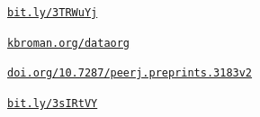 \documentclass[aspectratio=169,12pt,t]{beamer}
\begin{document}
\begin{frame}[c]{}

  \note{
  }
\end{frame}


\begin{frame}[c]{}
  \vspace{8pt}

  \centerline{}

  \vfill
  \hfill
  \href{https://bit.ly/3TRWuYj}{\tt \footnotesize \lolit bit.ly/3TRWuYj}

  \note{
  }
\end{frame}


\begin{frame}[c]{}
  \vspace{8pt}

  \centerline{}

  \vfill
  \hfill
  \href{https://kbroman.org/dataorg}{\tt \footnotesize \lolit kbroman.org/dataorg}

  \note{
  }
\end{frame}


\begin{frame}[c]{}
  \vspace{8pt}

  \centerline{}

  \vfill
  \hfill
  \href{https://doi.org/10.7287/peerj.preprints.3183v2}{\tt \footnotesize \lolit doi.org/10.7287/peerj.preprints.3183v2}

  \note{
  }
\end{frame}


\begin{frame}[c]{}

  \note{
  }
\end{frame}


\begin{frame}[c]{}
  \vspace{8pt}

  \centerline{}

  \vfill
  \hfill
  \href{https://bit.ly/3sIRtVY}{\tt \footnotesize \lolit bit.ly/3sIRtVY}

  \note{
  }
\end{frame}
\end{document}
